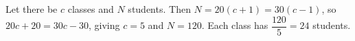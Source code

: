 Let there be $c$ classes and $N$ students. Then $N=20(c+1)=30(c-1)$, so $20c+20=30c-30$, giving $c=5$ and $N=120$. Each class has $\dfrac{120}{5}=\boxed{24}$ students.
